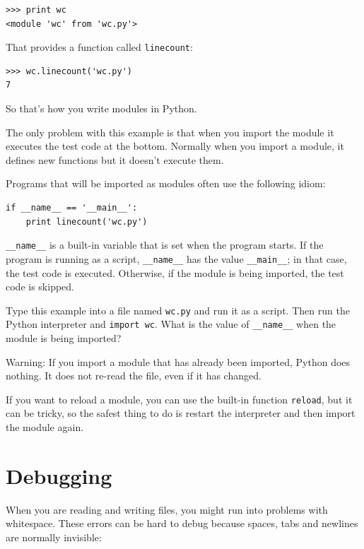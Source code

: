 \documentclass[10pt]{book}
\begin{document}
\begin{verbatim}
>>> print wc
<module 'wc' from 'wc.py'>
\end{verbatim}
%
That provides a function called \verb"linecount":

\begin{verbatim}
>>> wc.linecount('wc.py')
7
\end{verbatim}
%
So that's how you write modules in Python.

The only problem with this example is that when you import
the module it executes the test code at the bottom.  Normally
when you import a module, it defines new functions but it
doesn't execute them.

Programs that will be imported as modules often
use the following idiom:

\begin{verbatim}
if __name__ == '__main__':
    print linecount('wc.py')
\end{verbatim}
%
\verb"__name__" is a built-in variable that is set when the
program starts.  If the program is running as a script,
\verb"__name__" has the value \verb"__main__"; in that
case, the test code is executed.  Otherwise,
if the module is being imported, the test code is skipped.

\begin{exercise}

Type this example into a file named {\tt wc.py} and run
it as a script.  Then run the Python interpreter and
{\tt import wc}.  What is the value of \verb"__name__"
when the module is being imported?

Warning: If you import a module that has already been imported,
Python does nothing.  It does not re-read the file, even if it has
changed.

If you want to reload a module, you can use the built-in function
{\tt reload}, but it can be tricky, so the safest thing to do is
restart the interpreter and then import the module again.

\end{exercise}



\section{Debugging}

When you are reading and writing files, you might run into problems
with whitespace.  These errors can be hard to debug because spaces,
tabs and newlines are normally invisible:
\end{document}
